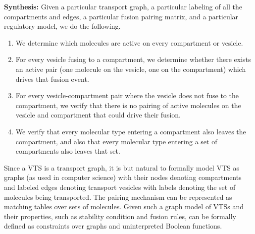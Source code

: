 \textbf{Synthesis:} Given a particular transport graph, a particular labeling of all the compartments and edges, a particular fusion pairing matrix, and a particular regulatory model, we do the following.

\begin{enumerate}
\item We determine which molecules are active on every compartment or vesicle.
\item For every vesicle fusing to a compartment, we determine whether there exists an active pair (one molecule on the vesicle, one on the compartment) which drives that fusion event.
\item For every vesicle-compartment pair where the vesicle does not fuse to the compartment, we verify that there is no pairing of active molecules on the
vesicle and compartment that could drive their fusion.
\item We verify that every molecular type entering a compartment also leaves the compartment, and also that every molecular type entering a set of compartments also leaves that set.
\end{enumerate}


\label{subsec:graphmodel}
%
Since a VTS is a transport graph, it is but natural to formally model
VTS as graphs (as used in computer science) with their nodes denoting
compartments and labeled edges denoting transport vesicles with labels
denoting the set of molecules being transported. The pairing mechanism
can be represented as matching tables over sets of molecules.
%
Given such a graph model of VTSs and their properties, such as
stability condition and fusion rules, can be formally defined as
constraints over graphs and uninterpreted Boolean functions.
%
\
   


